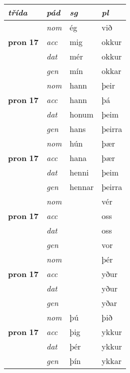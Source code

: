 \begin{center}
\begin{minipage}[t]{.45\textwidth}
\begin{tabular}{l>{\footnotesize\itshape}lll}
 {\textbf{\textit{třída}}} & {\textit{pád}}   & \textit{sg} & \textit{pl}  \\ 
 \hline
\multirow{3}{*}{{{\textbf{pron} \Large{\textbf{17}}}}}  &  nom & ég & við   \\*
 & acc &  mig  & okkur  \\*
 & dat & mér & okkur   \\*
 & gen & mín  & okkar  \\
\hline

\multirow{3}{*}{{{\textbf{pron} \Large{\textbf{17}}}}}  &  nom & hann & þeir   \\*
 & acc &  hann  & þá  \\*
 & dat & honum & þeim   \\*
 & gen & hans  & þeirra  \\
\hline

\multirow{3}{*}{{{\textbf{pron} \Large{\textbf{17}}}}}  &  nom & hún & þær   \\*
 & acc &  hana  & þær  \\*
 & dat & henni & þeim   \\*
 & gen & hennar  & þeirra  \\
\hline

\multirow{3}{*}{{{\textbf{pron} \Large{\textbf{17}}}}}  &  nom &  & vér   \\*
 & acc &    & oss  \\*
 & dat &  & oss   \\*
 & gen &   & vor  \\
\hline

\multirow{3}{*}{{{\textbf{pron} \Large{\textbf{17}}}}}  &  nom &  & þér   \\*
 & acc &    & yður  \\*
 & dat &  & yður   \\*
 & gen &   & yðar  \\
\hline

\multirow{3}{*}{{{\textbf{pron} \Large{\textbf{17}}}}}  &  nom & þú & þið   \\*
 & acc &  þig  & ykkur  \\*
 & dat & þér & ykkur   \\*
 & gen & þín  & ykkar  \\
\hline


\end{tabular}
\end{minipage}
\end{center}
